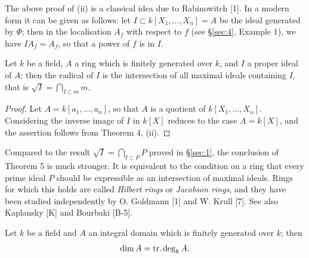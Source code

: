 \begin{remark}
The above proof of (ii) is a classical idea due to Rabinowitch
[1]. In a modern form it can be given as follows: let $I \subset k[X_1, \ldots, X_n] = A$
be the ideal generated by $\Phi$; then in the localisation $A_f$ with respect to $f$ (see
\S\ref{sec:4}, Example 1), we have $IA_f = A_f$, so that a power of $f$ is in $I$.
\end{remark}

\begin{theorem}\label{thm:5.5}
Let $k$ be a field, $A$ a ring which is finitely generated over $k$, and
$I$ a proper ideal of $A$; then the radical of $I$ is the intersection of all maximal
ideals containing $I$, that is $\sqrt{I} = \bigcap_{I \subset m} m$.
\end{theorem}

\begin{proof}
Let $A = k[a_1, \ldots, a_n]$, so that $A$ is a quotient of $k[X_1, \ldots, X_n]$.
Considering the inverse image of $I$ in $k[X]$ reduces to the case $A = k[X]$,
and the assertion follows from Theorem 4, (ii).
\end{proof}

Compared to the result $\sqrt{I} = \bigcap_{I \subset P} P$ proved in \S\ref{sec:1}, the conclusion of
Theorem 5 is much stronger. It is equivalent to the condition on a ring
that every prime ideal $P$ should be expressible as an intersection of maximal
ideals. Rings for which this holds are called \emph{Hilbert rings} or \emph{Jacobson rings},
and they have been studied independently by O. Goldmann [1] and
W. Krull [7]. See also Kaplansky [K] and Bourbaki [B-5].

\begin{theorem}\label{thm:5.6}
Let $k$ be a field and $A$ an integral domain which is finitely
generated over $k$; then
\[
  \dim A = \operatorname{tr.deg}_k A.
\]
\end{theorem}

